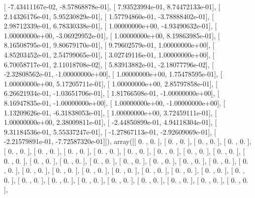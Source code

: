 \documentclass{article}
\begin{document}
       [ -7.43411167e-02,  -8.57868878e-01],
       [  7.93523994e-01,   8.74472133e-01],
       [  2.14326176e-01,   5.95230829e-01],
       [  1.57794860e-01,  -3.78888402e-01],
       [  2.98712339e-01,   6.78330338e-01],
       [  1.00000000e+00,  -4.93490632e-01],
       [  1.00000000e+00,  -3.06929952e-01],
       [  1.00000000e+00,   8.19863985e-01],
       [  8.16508795e-01,   9.80679170e-01],
       [  9.79602579e-01,   1.00000000e+00],
       [  4.85203452e-01,   2.54799065e-01],
       [  3.02749116e-01,   1.00000000e+00],
       [  6.70058717e-01,   2.11018708e-02],
       [  5.83913882e-01,  -2.18077796e-02],
       [ -2.32808562e-01,  -1.00000000e+00],
       [  1.00000000e+00,   1.75478595e-01],
       [  1.00000000e+00,   5.17205711e-01],
       [  1.00000000e+00,   2.85797858e-01],
       [  6.26621934e-01,  -1.03651706e-01],
       [  1.81766508e-01,  -1.00000000e+00],
       [  8.16947835e-01,  -1.00000000e+00],
       [  1.00000000e+00,  -1.00000000e+00],
       [  1.13209626e-01,  -6.31838053e-01],
       [  1.00000000e+00,   3.72459111e-01],
       [  1.00000000e+00,   2.38009811e-01],
       [ -2.44850899e-01,   4.94118304e-01],
       [  9.31184536e-01,   5.55337247e-01],
       [ -1.27867113e-01,  -2.92609069e-01],
       [ -2.21579891e-01,  -7.72587320e-01]]), array([[ 0.        ,  0.        ],
       [ 0.        ,  0.        ],
       [ 0.        ,  0.        ],
       [ 0.        ,  0.        ],
       [ 0.        ,  0.        ],
       [ 0.        ,  0.        ],
       [ 0.        ,  0.        ],
       [ 0.        ,  0.        ],
       [ 0.        ,  0.        ],
       [ 0.        ,  0.        ],
       [ 0.        ,  0.        ],
       [ 0.        ,  0.        ],
       [ 0.        ,  0.        ],
       [ 0.        ,  0.        ],
       [ 0.        ,  0.        ],
       [ 0.        ,  0.        ],
       [ 0.        ,  0.        ],
       [ 0.        ,  0.        ],
       [ 0.        ,  0.        ],
       [ 0.        ,  0.        ],
       [ 0.        ,  0.        ],
       [ 0.        ,  0.        ],
       [ 0.        ,  0.        ],
       [ 0.        ,  0.        ],
       [ 0.        ,  0.        ],
       [ 0.        ,  0.        ],
       [ 0.        ,  0.        ],
       [ 0.        ,  0.        ],
       [ 0.        ,  0.        ],
       [ 0.        ,  0.        ],
       [ 0.        ,  0.        ],
       [ 0.        ,  0.        ],
       [ 0.        ,  0.        ],
       [ 0.        ,  0.        ],
       [ 0.        ,  0.        ],
       [ 0.        ,  0.        ],
       [ 0.        ,  0.        ],
\end{document}
